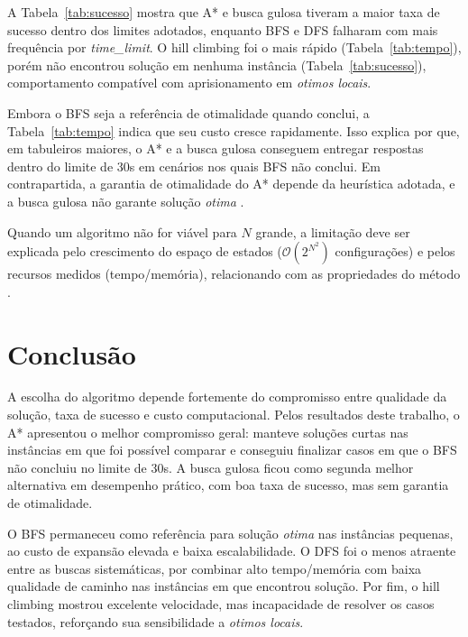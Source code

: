 \documentclass[12pt,a4paper]{article}
\begin{document}
A Tabela~\ref{tab:sucesso} mostra que A* e busca gulosa tiveram a maior taxa de sucesso dentro dos limites adotados, enquanto BFS e DFS falharam com mais frequ\^encia por \textit{time\_limit}. O hill climbing foi o mais r\'apido (Tabela~\ref{tab:tempo}), por\'em n\~ao encontrou solu\c{c}\~ao em nenhuma inst\^ancia (Tabela~\ref{tab:sucesso}), comportamento compat\'ivel com aprisionamento em \textit{otimos locais}.

Embora o BFS seja a refer\^encia de otimalidade quando conclui, a Tabela~\ref{tab:tempo} indica que seu custo cresce rapidamente. Isso explica por que, em tabuleiros maiores, o A* e a busca gulosa conseguem entregar respostas dentro do limite de 30s em cen\'arios nos quais BFS n\~ao conclui. Em contrapartida, a garantia de otimalidade do A* depende da heur\'istica adotada, e a busca gulosa n\~ao garante solu\c{c}\~ao \textit{otima} \citep{russell2021}.

Quando um algoritmo n\~ao for vi\'avel para $N$ grande, a limita\c{c}\~ao deve ser explicada pelo crescimento do espa\c{c}o de estados ($\mathcal{O}(2^{N^2})$ configura\c{c}\~oes) e pelos recursos medidos (tempo/mem\'oria), relacionando com as propriedades do m\'etodo \citep{russell2021}.

\section{Conclus\~ao}

A escolha do algoritmo depende fortemente do compromisso entre qualidade da solu\c{c}\~ao, taxa de sucesso e custo computacional. Pelos resultados deste trabalho, o A* apresentou o melhor compromisso geral: manteve solu\c{c}\~oes curtas nas inst\^ancias em que foi poss\'ivel comparar e conseguiu finalizar casos em que o BFS n\~ao concluiu no limite de 30s. A busca gulosa ficou como segunda melhor alternativa em desempenho pr\'atico, com boa taxa de sucesso, mas sem garantia de otimalidade.

O BFS permaneceu como refer\^encia para solu\c{c}\~ao \textit{otima} nas inst\^ancias pequenas, ao custo de expans\~ao elevada e baixa escalabilidade. O DFS foi o menos atraente entre as buscas sistem\'aticas, por combinar alto tempo/mem\'oria com baixa qualidade de caminho nas inst\^ancias em que encontrou solu\c{c}\~ao. Por fim, o hill climbing mostrou excelente velocidade, mas incapacidade de resolver os casos testados, refor\c{c}ando sua sensibilidade a \textit{otimos locais}.



\end{document}

